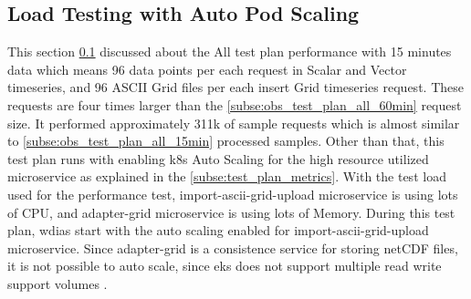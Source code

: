 \subsection{Load Testing with Auto Pod Scaling}
\label{subse:obs_test_plan_all_auto_15min}
This section \ref{subse:obs_test_plan_all_auto_15min} discussed about the All test plan performance with 15 minutes data which means 96 data points per each request in Scalar and Vector timeseries, and 96 ASCII Grid files per each insert Grid timeseries request. These requests are four times larger than the \ref{subse:obs_test_plan_all_60min} request size. It performed approximately 311k of sample requests which is almost similar to \ref{subse:obs_test_plan_all_15min} processed samples.
Other than that, this test plan runs with enabling \acrshort{k8s} Auto Scaling for the high resource utilized microservice as explained in the \ref{subse:test_plan_metrics}. With the test load used for the performance test, import-ascii-grid-upload microservice is using lots of CPU, and adapter-grid microservice is using lots of Memory. During this test plan, \acrshort{wdias} start with the auto scaling enabled for import-ascii-grid-upload microservice. Since adapter-grid is a consistence service for storing netCDF files, it is not possible to auto scale, since \acrshort{eks} does not support multiple read write support volumes \cite{LinuxFoundationPersistentKubernetes}.

